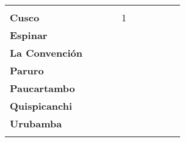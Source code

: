 \begin{tabular}{lccccccccc}
	&\cellcolor[HTML]{FCC46C}
	&\cellcolor[HTML]{FCC46C}
	&\cellcolor[HTML]{FCC46C}
	&\cellcolor[HTML]{FCC46C}
	&\cellcolor[HTML]{FCC46C}\\
	\textbf{Cusco}     												
	&\cellcolor[HTML]{FCC46C}
	&\cellcolor[HTML]{FCC46C}
	&\cellcolor[HTML]{FCC46C}
	&1
	&\cellcolor[HTML]{FCC46C}
	&\cellcolor[HTML]{FCC46C}
	&\cellcolor[HTML]{FCC46C}
	&\cellcolor[HTML]{FCC46C}\\								
	\textbf{Espinar}       					             							
	&\cellcolor[HTML]{FCC46C}					
	&\cellcolor[HTML]{FCC46C}
	&\cellcolor[HTML]{FCC46C}					
	&\cellcolor[HTML]{FCC46C}
	&\cellcolor[HTML]{FCC46C}					
	&\cellcolor[HTML]{FCC46C}
	&\cellcolor[HTML]{FCC46C}
	&\cellcolor[HTML]{FCC46C}\\	
	\textbf{La Convención}      													
	&\cellcolor[HTML]{FCC46C}
	&\cellcolor[HTML]{FCC46C}
	&\cellcolor[HTML]{FCC46C}
	&\cellcolor[HTML]{FCC46C}
	&\cellcolor[HTML]{FCC46C}
	&\cellcolor[HTML]{FCC46C}
	&\cellcolor[HTML]{FCC46C}
	&\cellcolor[HTML]{FCC46C}\\	
	\textbf{Paruro}                            					
	&\cellcolor[HTML]{FCC46C}					
	&\cellcolor[HTML]{FCC46C}					
	&\cellcolor[HTML]{FCC46C}					
	&\cellcolor[HTML]{FCC46C}					
	&\cellcolor[HTML]{FCC46C}
	&\cellcolor[HTML]{FCC46C} 					
	&\cellcolor[HTML]{FCC46C}
	&\cellcolor[HTML]{FCC46C}\\
	\textbf{Paucartambo}               		                       					
	&\cellcolor[HTML]{FCC46C}					
	&\cellcolor[HTML]{FCC46C}
	&\cellcolor[HTML]{FCC46C}					
	&\cellcolor[HTML]{FCC46C}
	&\cellcolor[HTML]{FCC46C}					
	&\cellcolor[HTML]{FCC46C}
	&\cellcolor[HTML]{FCC46C}
	&\cellcolor[HTML]{FCC46C}\\
	\textbf{Quispicanchi}     															
	&\cellcolor[HTML]{FCC46C}
	&\cellcolor[HTML]{FCC46C}
	&\cellcolor[HTML]{FCC46C}
	&\cellcolor[HTML]{FCC46C}
	&\cellcolor[HTML]{FCC46C}
	&\cellcolor[HTML]{FCC46C}
	&\cellcolor[HTML]{FCC46C}
	&\cellcolor[HTML]{FCC46C}\\
	\textbf{Urubamba}  																
	&\cellcolor[HTML]{FCC46C}
	&\cellcolor[HTML]{FCC46C}
	&\cellcolor[HTML]{FCC46C}
	&\cellcolor[HTML]{FCC46C}
	&\cellcolor[HTML]{FCC46C}
	&\cellcolor[HTML]{FCC46C}
	&\cellcolor[HTML]{FCC46C}
	&\cellcolor[HTML]{FCC46C}\\						
	&\multicolumn{1}{l}{}                       &\multicolumn{1}{l}{}            &\multicolumn{1}{l}{}                         
	&\multicolumn{1}{l}{}                       &\multicolumn{1}{l}{}            &\multicolumn{1}{l}{}                       &\multicolumn{1}{l}{}                       &\multicolumn{1}{l}{}            			    
\end{tabular}